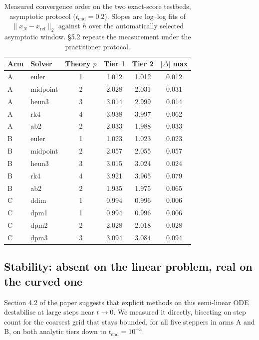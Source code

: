 \documentclass[11pt,a4paper]{article}
\begin{document}
\begin{table}[t]
\centering
\caption{Measured convergence order on the two exact-score testbeds, asymptotic
protocol ($t_{\text{end}} = 0.2$). Slopes are log--log fits of
$\lVert x_N - x_{\text{ref}}\rVert_2$ against $h$ over the automatically
selected asymptotic window. \S5.2 repeats the measurement under the practitioner
protocol.}
\label{tab:order12}
\small
\begin{tabular}{llcccc}
\toprule
Arm & Solver & Theory $p$ & Tier 1 & Tier 2 & $|\Delta|$ max \\
\midrule
A & euler     & 1 & 1.012 & 1.012 & 0.012 \\
A & midpoint  & 2 & 2.028 & 2.031 & 0.031 \\
A & heun3     & 3 & 3.014 & 2.999 & 0.014 \\
A & rk4       & 4 & 3.938 & 3.997 & 0.062 \\
A & ab2       & 2 & 2.033 & 1.988 & 0.033 \\
\midrule
B & euler     & 1 & 1.023 & 1.023 & 0.023 \\
B & midpoint  & 2 & 2.057 & 2.055 & 0.057 \\
B & heun3     & 3 & 3.015 & 3.024 & 0.024 \\
B & rk4       & 4 & 3.921 & 3.965 & 0.079 \\
B & ab2       & 2 & 1.935 & 1.975 & 0.065 \\
\midrule
C & ddim      & 1 & 0.994 & 0.996 & 0.006 \\
C & dpm1      & 1 & 0.994 & 0.996 & 0.006 \\
C & dpm2      & 2 & 2.028 & 2.018 & 0.028 \\
C & dpm3      & 3 & 3.094 & 3.084 & 0.094 \\
\bottomrule
\end{tabular}
\end{table}

\subsection{Stability: absent on the linear problem, real on the curved one}

Section 4.2 of the paper suggests that explicit methods on this semi-linear ODE
destabilise at large steps near $t\!\to\!0$. We measured it directly, bisecting on
step count for the coarsest grid that stays bounded, for all five steppers in
arms A and B, on both analytic tiers down to $t_{\text{end}} = 10^{-3}$.
\end{document}
